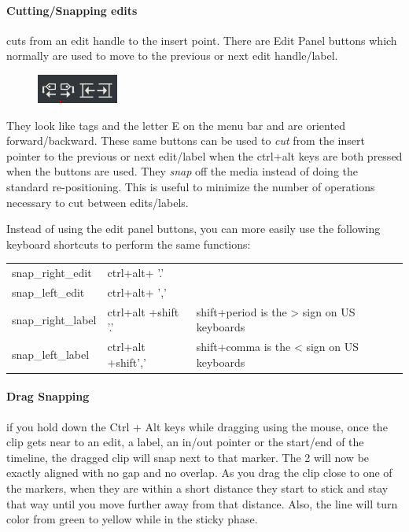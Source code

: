 \paragraph{Cutting/Snapping edits} cuts from an edit handle to the insert point. 
There are Edit Panel buttons which normally are used to move to the previous or next edit handle/label.
\begin{figure}
    \vspace{-1ex}
    \centering
    \includegraphics[width=0.7\linewidth]{images/snap.png}
\end{figure}
They look like tags and the letter E on the menu bar and are oriented forward/backward.  These same buttons can be used to \textit{cut} from the insert pointer to the previous or next edit/label when the ctrl+alt keys are both pressed when the buttons are used.  They \textit{snap} off the media instead of doing the standard re-positioning.  This is useful to minimize the number of operations necessary to cut between edits/labels.

Instead of using the edit panel buttons, you can more easily use the following keyboard shortcuts to perform the same functions:
\begin{center}
    \begin{tabular}{l l l}
        \toprule
        snap\_right\_edit &	ctrl+alt+ '.' & \\
        snap\_left\_edit &	ctrl+alt+ ',' & \\
        snap\_right\_label &	ctrl+alt +shift '.' &  shift+period is the > sign on US keyboards \\
        snap\_left\_label & 	ctrl+alt +shift',' &  shift+comma is the < sign on US keyboards \\
        \bottomrule
    \end{tabular}
\end{center}

\paragraph{Drag Snapping} if you hold down the Ctrl + Alt keys while dragging using the mouse, once the clip gets near to an edit, a label, an in/out pointer or the start/end of the timeline, the dragged clip will snap next to that marker.  The 2 will now be exactly aligned with no gap and no overlap.  As you drag the clip close to one of the markers, when they are within a short distance they start to stick and stay that way until you move further away from that distance.  Also, the line will turn color from green to yellow while in the sticky phase.

